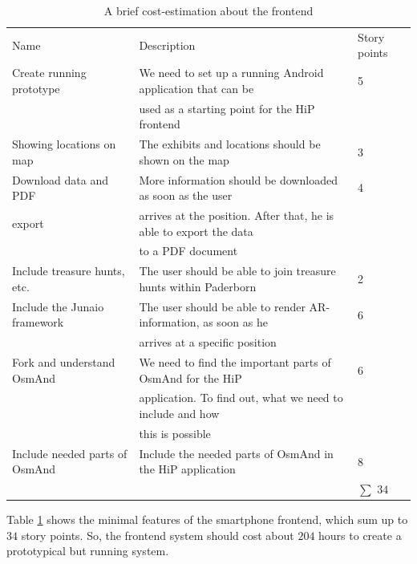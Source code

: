  \begin{table}[th]
\scriptsize
 \caption{A brief cost-estimation about the frontend}
 \begin{tabular}{lll}
	\toprule
  	Name & Description & Story points \\ 
	\cmidrule(rl){1-1}\cmidrule(rl){2-2}\cmidrule(rl){3-3}
	Create running prototype		&	We need to set up a running Android application that can be			&	5 \\	
							& 	 used as a starting point for the \ac{HiP} frontend					& 	\\
	Showing locations on map	&	The exhibits and locations should be shown on the map			&	3 \\	
	Download data and PDF	 	&	More information should be downloaded as soon as the user		&	4 \\	
	export					& 	arrives at the position. After that, he is able to export the data		&	\\
							& 	to a \ac{PDF} document										& 	\\
	Include treasure hunts, etc.	&	The user should be able to join treasure hunts within Paderborn		&	2 \\	
	Include the Junaio framework	&	The user should be able to render AR-information, as soon as he		&	6 \\			
							&	arrives at a specific position									&	\\
	Fork and understand \ac{OsmAnd}	&	We need to find the important parts of \ac{OsmAnd} for the \ac{HiP}	&	6 \\
							&	application. To find out, what we need to include and how 			&	\\
							&	this is possible												& \\
	Include needed parts of \ac{OsmAnd}	&	Include the needed parts of \ac{OsmAnd} in the \ac{HiP} application	&	8 \\	
					  	 	& 												& $\sum$ $34$   \\			
	\bottomrule
 \end{tabular}
 \label{tab:costFrontend}
 \end{table} 

Table \ref{tab:costFrontend} shows the minimal features of the smartphone frontend, which sum up to $34$ story points. So, the frontend system should cost about $204$ hours to create a prototypical but running system. 
